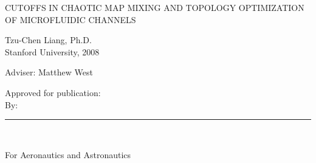 \documentclass[12pt]{report}
\def\title{Cutoffs in Chaotic Map Mixing and Topology Optimization of Microfluidic Channels}
\def\author{Tzu-Chen Liang}
\def\year{2008}
\def\principaladviser{Matthew West}
\def\department{Aeronautics and Astronautics}
\begin{document}
\pagestyle{empty}

\leavevmode


\begin{center}

    \Large\uppercase\expandafter
    {\title}

\end{center}

\begin{center}

    \author, Ph.D. \\
    Stanford University, \year \\

    \vspace{\baselineskip}

    Adviser:  \principaladviser

\end{center}

{}



\vfill

\hfill\parbox{3.2in}{\raggedright Approved for publication: \\[4mm]

              By:\hfill\rule[-2mm]{74mm}{0.4pt} \\[3pt]
    \hfill \parbox{74mm}{\raggedright For \department} }
\end{document}
